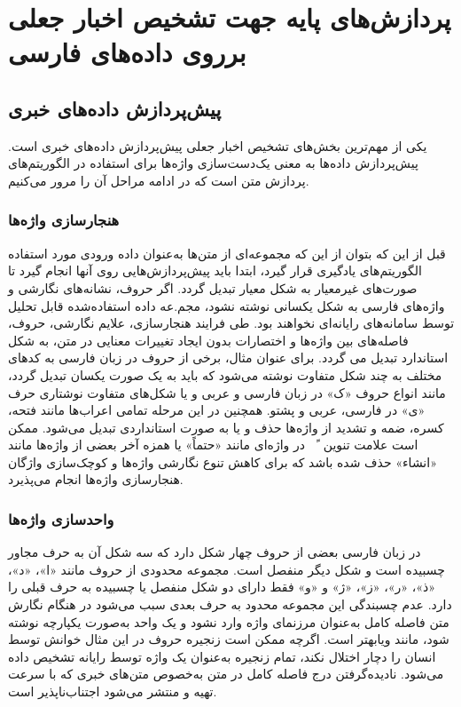\chapter{پردازش‌های پایه جهت تشخیص اخبار جعلی برروی داده‌های فارسی}
\section{پیش‌پردازش داده‌های خبری}
یکی از مهم‌ترین بخش‌های تشخیص اخبار جعلی پیش‌پردازش داده‌های خبری است. پیش‌پردازش داده‌ها به معنی یک‌دست‌سازی واژه‌ها برای استفاده در الگوریتم‌های پردازش متن است که در ادامه مراحل آن را مرور می‌کنیم.
 

\subsection[هنجارسازی واژه‌ها]{هنجارسازی واژه‌ها}
قبل از این که بتوان از این که مجموعه‌ای از متن‌ها به‌عنوان داده ورودی مورد استفاده الگوریتم‌های یادگیری قرار گیرد،  ابتدا باید پیش‌پردازش‌هایی روی آنها انجام گیرد تا صورت‌های غیرمعیار به شکل معیار تبدیل گردد. اگر حروف، نشانه‌های نگارشی و واژه‌های فارسی به شکل یکسانی نوشته نشود، مجم.عه داده استفاده‌شده قابل تحلیل توسط سامانه‌های رایانه‌ای نخواهند بود. طی فرایند هنجارسازی، علایم نگارشی، حروف، فاصله‌های بین واژه‌ها و اختصارات  بدون ایجاد تغییرات معنایی در متن، به شکل استاندارد تبدیل می گردد. برای عنوان مثال، برخی از حروف در زبان فارسی به کدهای مختلف به چند شکل متفاوت نوشته می‌شود که باید به یک صورت یکسان تبدیل گردد، مانند انواع حروف «ک» در زبان فارسی و عربی و یا شکل‌های متفاوت نوشتاری حرف «ی» در فارسی، عربی و پشتو. همچنین در این مرحله تمامی اعراب‌ها مانند فتحه، کسره، ضمه  و تشدید از واژه‌ها حذف و یا به صورت استانداردی تبدیل می‌شود. ممکن است  علامت تنوین  ~ً~ در واژه‌ای مانند «حتماً» یا همزه آخر بعضی از واژه‌ها مانند «انشاء» حذف  شده باشد که برای کاهش تنوع نگارشی واژه‌ها و کوچک‌‌سازی واژگان هنجارسازی واژه‌ها انجام می‌پذیرد.


\subsection[واحدسازی واژه‌ها]{واحدسازی واژه‌ها}
در زبان فارسی بعضی از حروف چهار شکل دارد که سه شکل آن به حرف مجاور چسبیده است و شکل دیگر منفصل است. مجموعه محدودی از حروف مانند «ا»، «د»، «ذ»، «ر»، «ز»، «ژ» و «و» فقط دارای دو شکل منفصل یا چسبیده به حرف قبلی را دارد. عدم چسبندگی این مجموعه محدود به حرف بعدی سبب می‌شود در هنگام نگارش  متن فاصله کامل به‌عنوان مرزنمای واژه وارد نشود و یک واحد به‌صورت یکپارچه نوشته شود، مانند ویابهتر است. اگرچه ممکن است زنجیره حروف در این مثال خوانش توسط انسان را دچار اختلال نکند، تمام زنجیره به‌عنوان یک واژه توسط رایانه تشخیص داده می‌شود.  نادیده‌گرفتن درج فاصله کامل در متن به‌خصوص متن‌های خبری که با سرعت تهیه و منتشر می‌شود اجتناب‌ناپذیر است.

